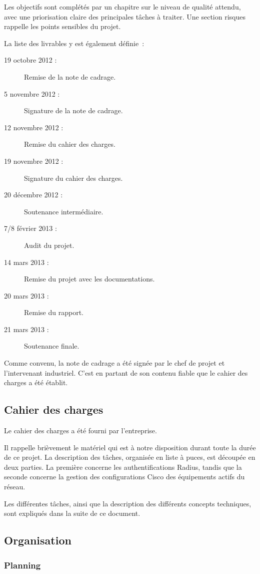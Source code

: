 Les objectifs sont complétés par un chapitre sur le niveau de qualité attendu, avec une priorisation claire des principales tâches à traiter. Une section risques rappelle les points sensibles du projet.

La liste des livrables y est également définie~:
\begin{description}
\item[19 octobre 2012 :] Remise de la note de cadrage.
\item[5 novembre 2012 :] Signature de la note de cadrage.
\item[12 novembre 2012 :] Remise du cahier des charges.
\item[19 novembre 2012 :] Signature du cahier des charges.
\item[20 décembre 2012 :] Soutenance intermédiaire.
\item[7/8 février 2013 :] Audit du projet.
\item[14 mars 2013 :] Remise du projet avec les documentations.
\item[20 mars 2013 :] Remise du rapport.
\item[21 mars 2013 :] Soutenance finale.
\end{description}

Comme convenu, la note de cadrage a été signée par le chef de projet et l'intervenant industriel. C'est en partant de son contenu fiable que le cahier des charges a été établit.

\subsection{Cahier des charges}

Le cahier des charges a été fourni par l'entreprise.

Il rappelle brièvement le matériel qui est à notre disposition durant toute la durée de ce projet. La description des tâches, organisée en liste à puces, est découpée en deux parties. La première concerne les authentifications Radius, tandis que la seconde concerne la gestion des configurations Cisco des équipements actifs du réseau.

Les différentes tâches, ainsi que la description des différents concepts techniques, sont expliqués dans la suite de ce document.

\subsection{Organisation}
\subsubsection{Planning}
